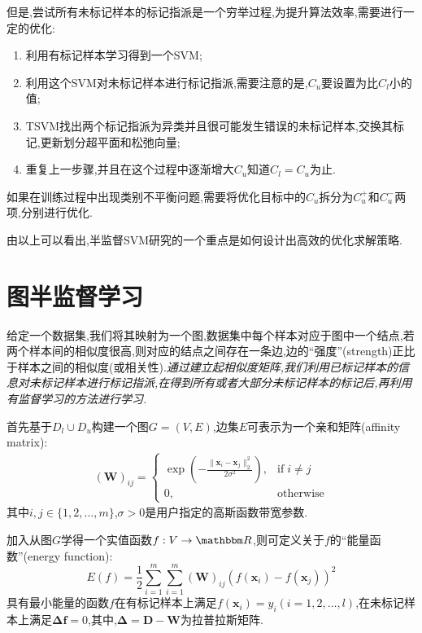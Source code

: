 但是,尝试所有未标记样本的标记指派是一个穷举过程,为提升算法效率,需要进行一定的优化:
\begin{enumerate}
\item 利用有标记样本学习得到一个SVM;
\item 利用这个SVM对未标记样本进行标记指派,需要注意的是,$C_u$要设置为比$C_l$小的值;
\item TSVM找出两个标记指派为异类并且很可能发生错误的未标记样本,交换其标记,更新划分超平面和松弛向量;
\item 重复上一步骤,并且在这个过程中逐渐增大$C_u$知道$C_l=C_u$为止.
\end{enumerate}

如果在训练过程中出现类别不平衡问题,需要将优化目标中的$C_u$拆分为$C_u^+$和$C_u^-$两项,分别进行优化.

由以上可以看出,半监督SVM研究的一个重点是如何设计出高效的优化求解策略.

\section{图半监督学习}

给定一个数据集,我们将其映射为一个图,数据集中每个样本对应于图中一个结点,若两个样本间的相似度很高,则对应的结点之间存在一条边,边的``强度''(strength)正比于样本之间的相似度(或相关性).\textit{通过建立起相似度矩阵,我们利用已标记样本的信息对未标记样本进行标记指派,在得到所有或者大部分未标记样本的标记后,再利用有监督学习的方法进行学习.}

首先基于$D_l\cup D_u$构建一个图$G=(V,E)$,边集$E$可表示为一个亲和矩阵(affinity matrix):
\begin{equation}\begin{split}
(\mathbf W)_{ij}=\begin{cases}
\exp(-\frac{\|\mathbf x_i-\mathbf x_j\|_2^2}{2\sigma^2}),&\text{if}\;i\ne j\\
0,&\text{otherwise}
\end{cases}\end{split}\end{equation}
其中$i,j\in\{1,2,\dots,m\}$,$\sigma>0$是用户指定的高斯函数带宽参数.

加入从图$G$学得一个实值函数$f:V\to\mathbbm R$,则可定义关于$f$的``能量函数''(energy function):
\begin{equation}
E(f)=\frac{1}{2}\sum_{i=1}^m\sum_{i=1}^m(\mathbf W)_{ij}(f(\mathbf x_i)-f(\mathbf x_j))^2
\end{equation}
具有最小能量的函数$f$在有标记样本上满足$f(\mathbf x_i)=y_i(i=1,2,\dots,l)$,在未标记样本上满足$\mathbf\Delta\mathbf f=0$,其中,$\mathbf\Delta=\mathbf D-\mathbf W$为拉普拉斯矩阵.

